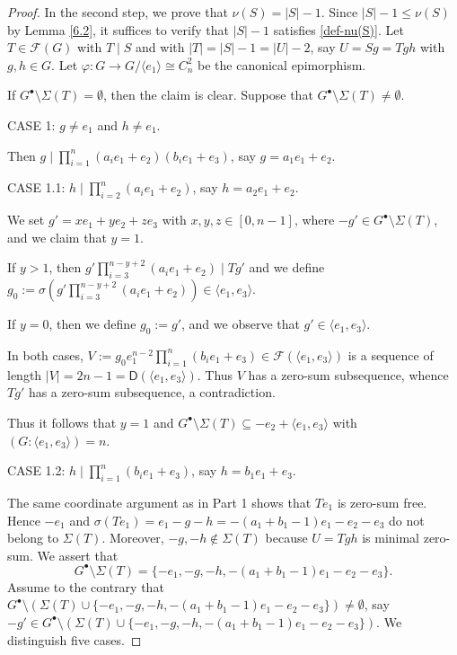 \documentclass[a4paper, 10pt]{amsart}
\theoremstyle{plain}
\theoremstyle{definition}
\numberwithin{equation}{section}
\begin{document}
{\begin{proof}
	
\medskip	
	In the second step,  we prove that $\nu (S) = |S|-1$.
	Since $|S|-1 \le \nu (S)$ by Lemma \ref{6.2}, it suffices to verify that $|S| - 1$ satisfies \eqref{def-nu(S)}. Let $T \in \mathcal F (G)$ with
	$T\mid S$ and with $|T|=|S|-1=|U|-2$, say  $U=Sg=Tgh$ with $g, h \in G$.  Let $\varphi \colon G\to G/\langle e_1 \rangle \cong C_n^2$ be the canonical epimorphism. 
	
	If $ G^{\bullet}\setminus \Sigma (T) = \emptyset$, then the claim is clear. 
	Suppose that $ G^{\bullet}\setminus \Sigma (T) \ne \emptyset$. 
	
	
	\smallskip
	\noindent
	CASE 1:  $g \ne e_1$ and $h \ne e_1$. 
	
	Then $g\mid \prod_{i=1}^n (a_ie_1+e_2)(b_ie_1+e_3)$, say  $g=a_1e_1+e_2$.
	
	\smallskip
	\noindent
	CASE 1.1:  $h\mid \prod_{i=2}^n (a_ie_1+e_2)$,  say $h=a_2e_1+e_2$. 
	
	We set $g'=xe_1+ye_2+ze_3$ with $x,y,z \in [0, n-1]$, where $-g'\in G^{\bullet}\setminus \Sigma (T)$, and we claim that $y=1$. 
	
	If $y>1$, then $g'\prod_{i=3}^{n-y+2} (a_ie_1+e_2)\mid Tg'$ and we define $g_0 :=\sigma(g'\prod_{i=3}^{n-y+2} (a_ie_1+e_2))\in \langle e_1,e_3 \rangle$. 
	
	If $y=0$, then we define $g_0:=g'$, and we observe that $g' \in \langle e_1,e_3 \rangle$.
	
	In both cases, $V:=g_0e_1^{n-2}\prod_{i=1}^n (b_ie_1+e_3) \in \mathcal F (\langle e_1,e_3 \rangle)$ is a sequence of length $|V|=2n-1=\mathsf{D}(\langle e_1,e_3 \rangle)$. Thus $V$ has a zero-sum subsequence, whence $Tg'$ has a zero-sum subsequence, a contradiction.
	
	Thus it follows that  $y=1$ and $G^{\bullet}\setminus \Sigma (T)\subseteq -e_2+ \langle e_1,e_3 \rangle$ with $(G:\langle e_1,e_3 \rangle)=n$. 
	
	\smallskip
	\noindent
	CASE 1.2: $h\mid \prod_{i=1}^n (b_ie_1+e_3)$,  say $h=b_1e_1+e_3$.
	
	

The same coordinate argument as in Part 1 shows that $Te_1$ is zero-sum free. Hence $-e_1$ and $\sigma(Te_1)=e_1-g-h=-(a_1+b_1-1)e_1-e_2-e_3$ do not belong to $\Sigma(T)$. Moreover, $-g,-h\notin\Sigma(T)$ because $U=Tgh$ is minimal zero-sum. We assert that
\[G^{\bullet}\setminus \Sigma (T)=\{-e_1,-g,-h, -(a_1+b_1-1)e_1-e_2-e_3\}.\] 
	Assume to the contrary that $G^{\bullet}\setminus \left(\Sigma (T) \cup \{ -e_1,-g,-h, -(a_1+b_1-1)e_1-e_2-e_3\}\right)\ne \emptyset$, say $-g'\in G^{\bullet}\setminus \left(\Sigma (T) \cup \{ -e_1,-g,-h, -(a_1+b_1-1)e_1-e_2-e_3\}\right)$. We distinguish five cases. 
	

\end{proof}}
\end{document}
